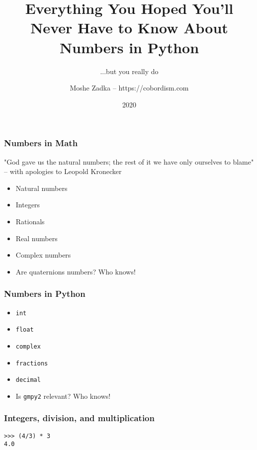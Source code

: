\usepackage{listings}
\usepackage{textcomp}
\usepackage{fancyvrb}

\title{Everything You Hoped You'll Never Have to Know About Numbers in Python}
\subtitle{...but you really do}
\author{Moshe Zadka -- https://cobordism.com}
\date{2020}


\begin{titlepage}
\maketitle
\end{titlepage}

\frame{\titlepage}

\begin{frame}
\frametitle{Numbers in Math}
"God gave us the natural numbers;
the rest of it we have only ourselves to blame" --
with apologies to Leopold Kronecker

\begin{itemize}
\item Natural numbers
\item Integers
\item Rationals
\item Real numbers
\item Complex numbers
\item Are quaternions numbers? Who knows!
\end{itemize}
\end{frame}


\begin{frame}[fragile]
\frametitle{Numbers in Python}

\begin{itemize}
\item \texttt{int}
\item \texttt{float}
\item \texttt{complex}
\item \texttt{fractions}
\item \texttt{decimal}
\item Is \texttt{gmpy2} relevant? Who knows!
\end{itemize}

\end{frame}

\begin{frame}[fragile]
\frametitle{Integers, division, and multiplication}

\begin{lstlisting}
>>> (4/3) * 3
4.0
\end{lstlisting}
\end{frame}

